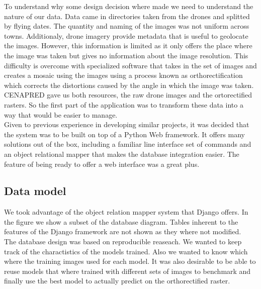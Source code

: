 To understand why some design decision where made we need to understand the nature of our data. Data came in directories taken from the drones and splitted by flying dates. The quantity and naming of the images was not uniform across towns. Additionaly, drone imagery provide metadata that is useful to geolocate the images. However, this information is limited as it only offers the place where the image was taken but gives no information about the image resolution. This difficulty is overcome with specialized software that takes in the set of images and creates a mosaic using the images using a process known as orthorectification which corrects the distortions caused by the angle in which the image was taken. CENAPRED gave us both resources, the raw drone images and the ortorectified rasters. So the first part of the application was to transform these data into a way that would be easier to manage.\\

Given to previous experience in developing similar projects, it was decided that the system was to be built on top of a Python Web framework. It offers many solutions out of the box, including a familiar line interface set of commands and an object relational mapper that makes the database integration easier. The feature of being ready to offer a web interface was a great plus.\\

\subsection{Data model}

We took advantage of the object relation mapper system that Django offers. In the figure \cite{fig:database} we show a subset of the database diagram. Tables inherent to the features of the Django framework are not shown as they where not modified.\\

The database design was based on reproducible reaseach. We wanted to keep track of the charactistics of the models trained. Also we wanted to know which where the training images used for each model. It was also desirable to be able to reuse models that where trained with different sets of images to benchmark and finally use the best model to actually predict on the orthorectified raster.\\


